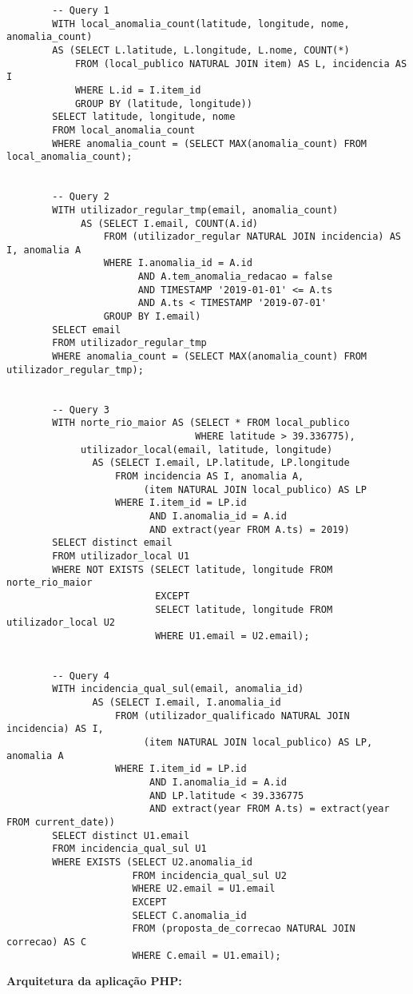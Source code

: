 \documentclass[12pt]{report}
\begin{document}
    \normalsize
    \vspace{2mm}

\begin{verbatim}
        -- Query 1
        WITH local_anomalia_count(latitude, longitude, nome, anomalia_count)
        AS (SELECT L.latitude, L.longitude, L.nome, COUNT(*)
            FROM (local_publico NATURAL JOIN item) AS L, incidencia AS I
            WHERE L.id = I.item_id
            GROUP BY (latitude, longitude))
        SELECT latitude, longitude, nome
        FROM local_anomalia_count
        WHERE anomalia_count = (SELECT MAX(anomalia_count) FROM local_anomalia_count);


        -- Query 2
        WITH utilizador_regular_tmp(email, anomalia_count)
             AS (SELECT I.email, COUNT(A.id)
                 FROM (utilizador_regular NATURAL JOIN incidencia) AS I, anomalia A
                 WHERE I.anomalia_id = A.id
                       AND A.tem_anomalia_redacao = false
                       AND TIMESTAMP '2019-01-01' <= A.ts
                       AND A.ts < TIMESTAMP '2019-07-01'
                 GROUP BY I.email)
        SELECT email
        FROM utilizador_regular_tmp
        WHERE anomalia_count = (SELECT MAX(anomalia_count) FROM utilizador_regular_tmp);


        -- Query 3
        WITH norte_rio_maior AS (SELECT * FROM local_publico
                                 WHERE latitude > 39.336775),
             utilizador_local(email, latitude, longitude)
               AS (SELECT I.email, LP.latitude, LP.longitude
                   FROM incidencia AS I, anomalia A,
                        (item NATURAL JOIN local_publico) AS LP
                   WHERE I.item_id = LP.id
                         AND I.anomalia_id = A.id
                         AND extract(year FROM A.ts) = 2019)
        SELECT distinct email
        FROM utilizador_local U1
        WHERE NOT EXISTS (SELECT latitude, longitude FROM norte_rio_maior
                          EXCEPT
                          SELECT latitude, longitude FROM utilizador_local U2
                          WHERE U1.email = U2.email);


        -- Query 4
        WITH incidencia_qual_sul(email, anomalia_id)
               AS (SELECT I.email, I.anomalia_id
                   FROM (utilizador_qualificado NATURAL JOIN incidencia) AS I,
                        (item NATURAL JOIN local_publico) AS LP, anomalia A
                   WHERE I.item_id = LP.id
                         AND I.anomalia_id = A.id
                         AND LP.latitude < 39.336775
                         AND extract(year FROM A.ts) = extract(year FROM current_date))
        SELECT distinct U1.email
        FROM incidencia_qual_sul U1
        WHERE EXISTS (SELECT U2.anomalia_id
                      FROM incidencia_qual_sul U2
                      WHERE U2.email = U1.email
                      EXCEPT
                      SELECT C.anomalia_id
                      FROM (proposta_de_correcao NATURAL JOIN correcao) AS C
                      WHERE C.email = U1.email);
    \end{verbatim}
    \newpage
    \Large
    \textbf{Arquitetura da aplicação PHP:}
\end{document}
